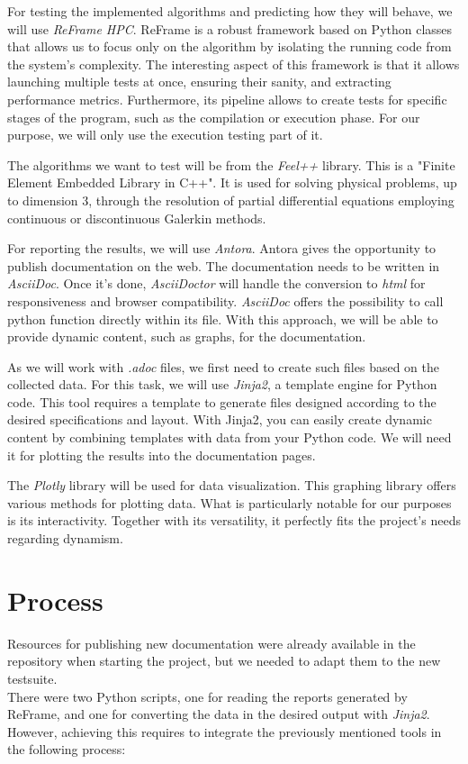 \documentclass[12pt]{article}
\begin{document}
For testing the implemented algorithms and predicting how they will behave, we will use \textit{ReFrame HPC}\cite*{ReFrame}.
ReFrame is a robust framework based on Python classes that allows us to focus only on the algorithm by isolating the running code from the system's complexity.
The interesting aspect of this framework is that it allows launching multiple tests at once, ensuring their sanity, and extracting performance metrics.
Furthermore, its pipeline allows to create tests for specific stages of the program, such as the compilation or execution phase. 
For our purpose, we will only use the execution testing part of it.

The algorithms we want to test will be from the \textit{Feel++}\cite*{Feel++} library.
This is a "Finite Element Embedded Library in C++". It is used for solving physical problems, up to dimension 3,
through the resolution of partial differential equations employing continuous or discontinuous Galerkin methods. 

For reporting the results, we will use \textit{Antora}\cite*{Antora}. Antora gives the opportunity to publish documentation on the web.
The documentation needs to be written in \textit{AsciiDoc}. Once it's done, \textit{AsciiDoctor} will handle the conversion to \textit{html}
for responsiveness and browser compatibility.
\textit{AsciiDoc} offers the possibility to call python function directly within its file. With this approach, we will be able to provide dynamic content,
such as graphs, for the documentation.

As we will work with \textit{.adoc} files, we first need to create such files based on the collected data.
For this task, we will use \textit{Jinja2}\cite*{Jinja2}, a template engine for Python code.
This tool requires a template to generate files designed according to the desired specifications and layout.
With Jinja2, you can easily create dynamic content by combining templates with data from your Python code.
We will need it for plotting the results into the documentation pages.


The \textit{Plotly}\cite*{Plotly} library will be used for data visualization. This graphing library offers various methods for plotting data.
What is particularly notable for our purposes is its interactivity. Together with its versatility, it perfectly fits the project's needs
regarding dynamism.

\newpage
\section{Process}
Resources for publishing new documentation were already available in the repository when starting the project, but we needed to adapt them to the new testsuite.\\
There were two Python scripts, one for reading the reports generated by ReFrame, and one for converting the data in the desired output with \textit{Jinja2}. \\
However, achieving this requires to integrate the previously mentioned tools in the following process:
\end{document}
